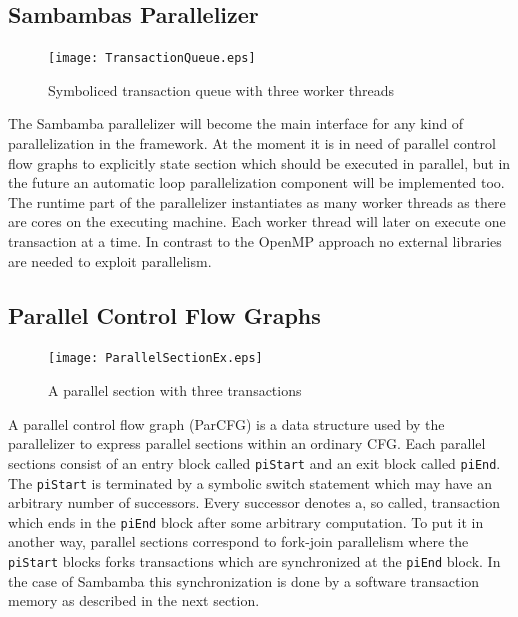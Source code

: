 \clearpage
\subsection{Sambambas Parallelizer}
\begin{figure}
  \centering
  \texttt{[image: TransactionQueue.eps]}
  \caption{Symboliced transaction queue with three worker threads}
  \label{fig:TransactionQueue}  
\end{figure}
The Sambamba parallelizer will become the main interface for any kind of 
parallelization in the framework. At the moment it is in need of parallel control
flow graphs to explicitly state section which should be executed in parallel, but
in the future an automatic loop parallelization component will be implemented too. 
The runtime part of the parallelizer instantiates as many worker threads as 
there are cores on the executing machine. Each worker thread will later on execute 
one transaction at a time. In contrast to the OpenMP approach
no external libraries are needed to exploit parallelism. \\


\subsection{Parallel Control Flow Graphs}
\begin{figure}
  \centering
  \vspace*{-2mm}
  \begin{minipage}[c][0.37\width]{\textwidth}
  \texttt{[image: ParallelSectionEx.eps]}
  \end{minipage}
  \caption{A parallel section with three transactions}
  \vspace*{-3mm}
  \label{fig:ParallelSectionEx}  
\end{figure}
A parallel control flow graph (ParCFG) is a data structure used by the
parallelizer to express parallel sections within an ordinary CFG. 
Each parallel sections consist of an entry block called \texttt{piStart} and
an exit block called \texttt{piEnd}. The \texttt{piStart} is terminated by a 
symbolic switch statement which may have an arbitrary number of successors. 
Every successor denotes a, so called, transaction which ends in the 
\texttt{piEnd} block after some arbitrary computation. 
To put it in another way, parallel sections correspond to
fork-join parallelism where the \texttt{piStart} blocks forks transactions 
which are synchronized at the \texttt{piEnd} block. In the case of Sambamba this
synchronization is done by a software transaction memory as described in the 
next section.


